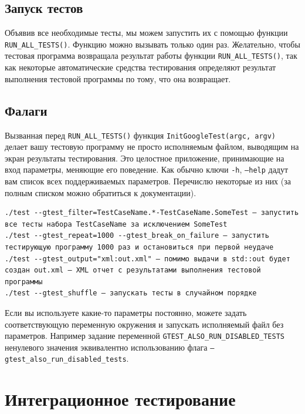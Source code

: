 \documentclass[12pt, twoside]{report}
\begin{document}
\subsection*{Запуск тестов}

Объявив все необходимые тесты, мы можем запустить их с помощью функции \texttt{RUN\_ALL\_TESTS()}. Функцию можно вызывать только один раз. Желательно, чтобы тестовая программа возвращала 
результат работы функции \texttt{RUN\_ALL\_TESTS()}, так как некоторые автоматические средства тестирования определяют результат выполнения тестовой программы по тому, что она возвращает.

\subsection*{Фалаги}


Вызванная перед \texttt{RUN\_ALL\_TESTS()} функция \texttt{InitGoogleTest(argc, argv)} делает вашу тестовую программу не просто исполняемым файлом, выводящим на экран результаты тестирования. 
Это целостное приложение, принимающие на вход параметры, меняющие его поведение. Как обычно ключи \texttt{-h}, \texttt{--help} дадут вам список всех поддерживаемых параметров. Перечислю некоторые 
из них (за полным списком можно обратиться к документации).
\begin{verbatim}
./test --gtest_filter=TestCaseName.*-TestCaseName.SomeTest — запустить все тесты набора TestCaseName за исключением SomeTest
./test --gtest_repeat=1000 --gtest_break_on_failure — запустить тестирующую программу 1000 раз и остановиться при первой неудаче
./test --gtest_output="xml:out.xml" — помимо выдачи в std::out будет создан out.xml — XML отчет с результатами выполнения тестовой программы
./test --gtest_shuffle — запускать тесты в случайном порядке
\end{verbatim}

Если вы используете какие-то параметры постоянно, можете задать соответствующую переменную окружения и запускать исполняемый файл без параметров. 
Например задание переменной \texttt{GTEST\_ALSO\_RUN\_DISABLED\_TESTS} ненулевого значения эквивалентно использованию флага \texttt{--gtest\_also\_run\_disabled\_tests}.

\section*{Интеграционное тестирование}
\end{document}
